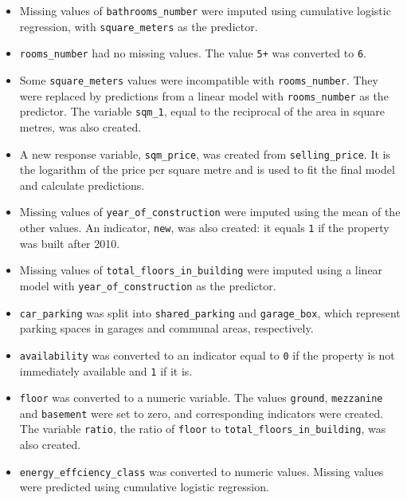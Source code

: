 \documentclass[a4paper,11pt]{article}
\begin{document}
\begin{itemize}
  \item Missing values of \texttt{bathrooms\_number} were imputed using cumulative
  logistic regression, with \texttt{square\_meters} as the predictor.

  \item \texttt{rooms\_number} had no missing values. The value \texttt{5+} was
  converted to \texttt{6}.

  \item Some \texttt{square\_meters} values were incompatible with
  \texttt{rooms\_number}. They were replaced by predictions
  from a linear model with \texttt{rooms\_number} as the predictor. The variable
  \texttt{sqm\_1}, equal to the reciprocal of the area in square metres, was also
  created.

  \item A new response variable, \texttt{sqm\_price}, was created from
  \texttt{selling\_price}. It is the logarithm of the price per square metre and
  is used to fit the final model and calculate predictions.

  \item Missing values of \texttt{year\_of\_construction} were imputed using the
  mean of the other values. An indicator, \texttt{new}, was also created: it equals
  \texttt{1} if the property was built after 2010.

  \item Missing values of \texttt{total\_floors\_in\_building} were imputed using
  a linear model with \texttt{year\_of\_construction} as the predictor.

  \item \texttt{car\_parking} was split into \texttt{shared\_parking} and
  \texttt{garage\_box}, which represent parking spaces in garages and communal
  areas, respectively.

  \item \texttt{availability} was converted to an indicator equal to \texttt{0}
  if the property is not immediately available and \texttt{1} if it is.

  \item \texttt{floor} was converted to a numeric variable. The values
  \texttt{ground}, \texttt{mezzanine} and \texttt{basement} were set to zero, and
  corresponding indicators were created. The variable \texttt{ratio}, the ratio
  of \texttt{floor} to \texttt{total\_floors\_in\_building}, was also created.

  \item \texttt{energy\_effciency\_class} was converted to numeric values.
  Missing values were predicted using cumulative logistic regression.


\end{itemize}
\end{document}
